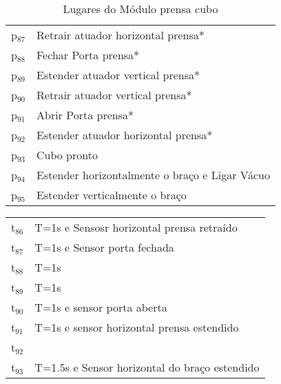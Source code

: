 \begin{table}[htbp]
\caption{Lugares do Módulo prensa cubo}
\centering
\begin{tabular}{ll}
p\(_{\text{87}}\) & Retrair atuador horizontal prensa*\\
p\(_{\text{88}}\) & Fechar Porta prensa*\\
p\(_{\text{89}}\) & Estender atuador vertical prensa*\\
p\(_{\text{90}}\) & Retrair atuador vertical prensa*\\
p\(_{\text{91}}\) & Abrir Porta prensa*\\
p\(_{\text{92}}\) & Estender atuador horizontal prensa*\\
p\(_{\text{93}}\) & Cubo pronto\\
p\(_{\text{94}}\) & Estender horizontalmente o braço e Ligar Vácuo\\
p\(_{\text{95}}\) & Estender verticalmente o braço\\
\end{tabular}
\end{table}

\begin{center}
\begin{tabular}{ll}
t\(_{\text{86}}\) & T=1s e Sensosr horizontal prensa retraído\\
t\(_{\text{87}}\) & T=1s e Sensor porta fechada\\
t\(_{\text{88}}\) & T=1s\\
t\(_{\text{89}}\) & T=1s\\
t\(_{\text{90}}\) & T=1s e sensor porta aberta\\
t\(_{\text{91}}\) & T=1s e sensor horizontal prensa estendido\\
t\(_{\text{92}}\) & \\
t\(_{\text{93}}\) & T=1.5s e Sensor horizontal do braço estendido\\
\end{tabular}
\end{center}
